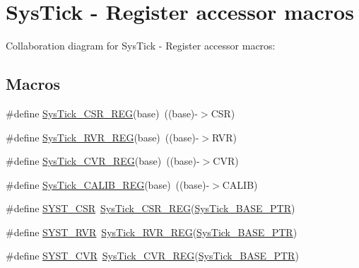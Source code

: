 \hypertarget{group___sys_tick___register___accessor___macros}{}\section{Sys\+Tick -\/ Register accessor macros}
\label{group___sys_tick___register___accessor___macros}
Collaboration diagram for Sys\+Tick -\/ Register accessor macros\+:
\subsection*{Macros}
\begin{DoxyCompactItemize}
\item 
\#define \hyperlink{group___sys_tick___register___accessor___macros_gaf55a190fd4086e13691f11a798185b64}{Sys\+Tick\+\_\+\+C\+S\+R\+\_\+\+R\+EG}(base)~((base)-\/$>$C\+SR)
\item 
\#define \hyperlink{group___sys_tick___register___accessor___macros_ga40d4d1869a3c9a27daa2c8ad4649665f}{Sys\+Tick\+\_\+\+R\+V\+R\+\_\+\+R\+EG}(base)~((base)-\/$>$R\+VR)
\item 
\#define \hyperlink{group___sys_tick___register___accessor___macros_ga359580315175ed2d0535ca1ca67f842b}{Sys\+Tick\+\_\+\+C\+V\+R\+\_\+\+R\+EG}(base)~((base)-\/$>$C\+VR)
\item 
\#define \hyperlink{group___sys_tick___register___accessor___macros_ga49a5f3af22dff7288ad031b8b3bf1b7a}{Sys\+Tick\+\_\+\+C\+A\+L\+I\+B\+\_\+\+R\+EG}(base)~((base)-\/$>$C\+A\+L\+IB)
\item 
\#define \hyperlink{group___sys_tick___register___accessor___macros_gab26b3fc75982181f81b185b206e897f6}{S\+Y\+S\+T\+\_\+\+C\+SR}~\hyperlink{group___sys_tick___register___accessor___macros_gaf55a190fd4086e13691f11a798185b64}{Sys\+Tick\+\_\+\+C\+S\+R\+\_\+\+R\+EG}(\hyperlink{group___sys_tick___peripheral_gaeef73642fdef722ce658e468dad877ea}{Sys\+Tick\+\_\+\+B\+A\+S\+E\+\_\+\+P\+TR})
\item 
\#define \hyperlink{group___sys_tick___register___accessor___macros_ga4e8efcc1f2b551dbf3cb0aae1231e380}{S\+Y\+S\+T\+\_\+\+R\+VR}~\hyperlink{group___sys_tick___register___accessor___macros_ga40d4d1869a3c9a27daa2c8ad4649665f}{Sys\+Tick\+\_\+\+R\+V\+R\+\_\+\+R\+EG}(\hyperlink{group___sys_tick___peripheral_gaeef73642fdef722ce658e468dad877ea}{Sys\+Tick\+\_\+\+B\+A\+S\+E\+\_\+\+P\+TR})
\item 
\#define \hyperlink{group___sys_tick___register___accessor___macros_gae3dc4d2dbfdf38c593a5581415fecfed}{S\+Y\+S\+T\+\_\+\+C\+VR}~\hyperlink{group___sys_tick___register___accessor___macros_ga359580315175ed2d0535ca1ca67f842b}{Sys\+Tick\+\_\+\+C\+V\+R\+\_\+\+R\+EG}(\hyperlink{group___sys_tick___peripheral_gaeef73642fdef722ce658e468dad877ea}{Sys\+Tick\+\_\+\+B\+A\+S\+E\+\_\+\+P\+TR})

\end{DoxyCompactItemize}
